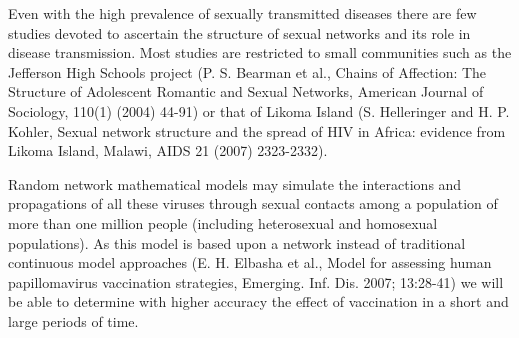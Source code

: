 Even with the high prevalence of sexually transmitted diseases there are few studies devoted to ascertain the structure of sexual networks and its role in disease transmission. Most studies are restricted to small communities such as the Jefferson High Schools project (P. S. Bearman et al., Chains of Affection: The Structure of Adolescent Romantic and Sexual Networks, American Journal of Sociology, 110(1) (2004) 44-91) or that of Likoma Island (S. Helleringer and H. P. Kohler, Sexual network structure and the spread of HIV in Africa: evidence from Likoma Island, Malawi, AIDS 21 (2007) 2323-2332).

Random network mathematical models may simulate the interactions and propagations of all these viruses through sexual contacts among a population of more than one million people (including heterosexual and homosexual populations). As this model is based upon a network instead of traditional continuous model approaches (E. H. Elbasha et al., Model for assessing human papillomavirus vaccination strategies,  Emerging. Inf. Dis.  2007; 13:28-41) we will be able to determine with higher accuracy the effect of vaccination in a short and large periods of time.

